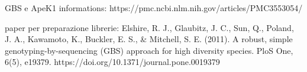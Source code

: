 GBS e ApeK1 informations: https://pmc.ncbi.nlm.nih.gov/articles/PMC3553054/

paper per preparazione librerie: Elshire, R. J., Glaubitz, J. C., Sun, Q., Poland, J. A., Kawamoto, K., Buckler, E. S., & Mitchell, S. E. (2011). A robust, simple genotyping-by-sequencing (GBS) approach for high diversity species. PloS One, 6(5), e19379. https://doi.org/10.1371/journal.pone.0019379